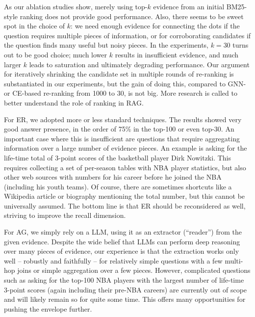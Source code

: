 \vspace{0.2cm}
 As our ablation studies show, merely using top-$k$ evidence from an initial BM25-style ranking does not provide good performance. Also, there seems to be sweet spot in the choice of $k$: we need enough evidence for connecting the dots if the question requires multiple pieces of information, or for corroborating candidates if the question finds many useful but noisy pieces. In the experiments, $k=30$ turns out to be good choice; much lower $k$ results in insufficient evidence, and much larger $k$ leads to saturation and ultimately degrading performance. Our argument for iteratively shrinking the candidate set in multiple rounds of re-ranking is substantiated in our experiments, but the gain of doing this, compared to GNN- or CE-based re-ranking from 1000 to 30, is not big. More research is called to better understand the role of ranking in RAG. 

\vspace{0.2cm}
For ER, we adopted more or less standard techniques. The results showed very good answer presence, in the order of 75\% in the top-100 or even top-30. An important case where this is insufficient are questions that require aggregating information over a large number of evidence pieces. An example is asking for the life-time total of 3-point scores of the basketball player Dirk Nowitzki.
This requires collecting a set of per-season tables with NBA player statistics, but also other web sources with numbers for his career before he joined the NBA (including his youth teams).
Of course, there are sometimes shortcuts like a Wikipedia article or biography mentioning the total number, but this cannot be universally assumed. The bottom line is that ER should be reconsidered as well, striving to improve the recall dimension.

\vspace{0.2cm}
For AG, we simply rely on a LLM,
using it as an extractor (``reader'') from the given evidence. Despite the wide belief that LLMs can perform deep
reasoning over many pieces of evidence, our experience is that the extraction works only well – robustly and faithfully – for relatively simple questions with a few multi-hop joins or simple aggregation over a few pieces. However, complicated questions such as asking for the top-100 NBA players with the largest number of life-time 3-point scores (again including their pre-NBA careers) are currently out of scope and will likely remain so for quite some time. This offers many opportunities for pushing the envelope further.

